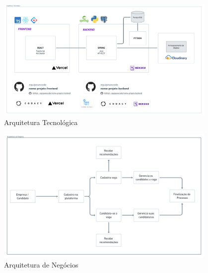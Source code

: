 \begin{figure}[htb]
	\centering
	\caption{\label{fig_arq_tec}Arquitetura Tecnológica}
	\includegraphics[width=0.95\textwidth]{imagens/arq-proj-arq-tec.png}
\end{figure}

\begin{figure}[htb]
	\centering
	\caption{\label{fig_arq_negocio}Arquitetura de Negócios}
	\includegraphics[width=0.95\textwidth]{imagens/arq-proj-arq-negocio.png}
\end{figure}